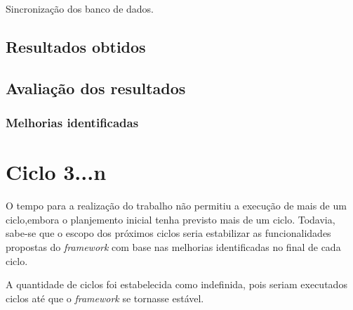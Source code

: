       Sincronização dos banco de dados.
  
  \section{Resultados obtidos}
  
  
  \section{Avaliação dos resultados}
  
    \subsection{Melhorias identificadas}
    
\chapter{Ciclo 3...n}
  
  O tempo para a realização do trabalho não permitiu a execução de mais de um
  ciclo,embora o planjemento inicial tenha previsto mais de um ciclo. Todavia, sabe-se que o escopo dos próximos
  ciclos seria estabilizar as funcionalidades propostas do \textit{framework} com base nas melhorias identificadas
  no final de cada ciclo.
  
  A quantidade de ciclos foi estabelecida como indefinida, pois seriam executados
  ciclos até que o \textit{framework} se tornasse estável.
  